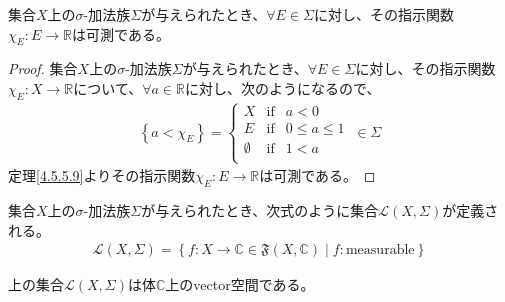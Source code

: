 \documentclass[dvipdfmx]{jsarticle}
\begin{document}
\begin{thm}\label{4.5.5.15}
集合$X$上の$\sigma$-加法族$\varSigma$が与えられたとき、$\forall E \in \varSigma$に対し、その指示関数$\chi_{E}:E \rightarrow \mathbb{R}$は可測である。
\end{thm}
\begin{proof}
集合$X$上の$\sigma$-加法族$\varSigma$が与えられたとき、$\forall E \in \varSigma$に対し、その指示関数$\chi_{E}:X \rightarrow \mathbb{R}$について、$\forall a \in \mathbb{R}$に対し、次のようになるので、
\begin{align*}
\left\{ a < \chi_{E} \right\} = \left\{ \begin{matrix}
X & \mathrm{if} & a < 0 \\
E & \mathrm{if} & 0 \leq a \leq 1 \\
\emptyset & \mathrm{if} & 1 < a \\
\end{matrix} \right.\  \in \varSigma
\end{align*}
定理\ref{4.5.5.9}よりその指示関数$\chi_{E}:E \rightarrow \mathbb{R}$は可測である。
\end{proof}
\begin{dfn}
集合$X$上の$\sigma$-加法族$\varSigma$が与えられたとき、次式のように集合$\mathcal{L}(X,\varSigma)$が定義される。
\begin{align*}
\mathcal{L}(X,\varSigma) = \left\{ f:X \rightarrow \mathbb{C}\in \mathfrak{F}\left( X,\mathbb{C} \right) \middle| f:\mathrm{measurable} \right\}
\end{align*}
\end{dfn}
\begin{thm}\label{4.5.5.16}
上の集合$\mathcal{L}(X,\varSigma)$は体$\mathbb{C}$上のvector空間である。
\end{thm}
\end{document}
